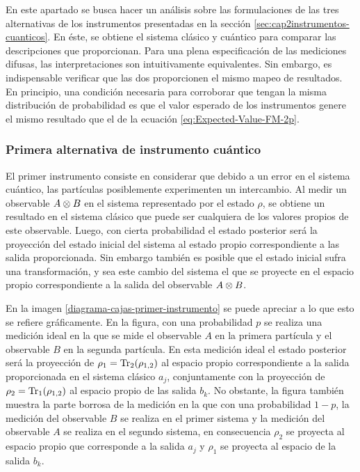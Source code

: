 En este apartado se busca hacer un análisis sobre las formulaciones de las tres alternativas de los instrumentos presentadas en la sección {\ref{sec:cap2instrumentos-cuanticos}}. En éste, se obtiene el sistema clásico y cuántico para comparar las descripciones que proporcionan. Para una plena especificación de las mediciones difusas, las interpretaciones son intuitivamente equivalentes. Sin embargo, es indispensable verificar que las dos proporcionen el mismo mapeo de resultados. En principio, una condición necesaria para corroborar que tengan la misma distribución de probabilidad es que el valor esperado de los instrumentos genere el mismo resultado que el de la ecuación {\eqref{eq:Expected-Value-FM-2p}}. 


\subsubsection{Primera alternativa de instrumento cuántico} %



El primer instrumento consiste en considerar que debido a un error en el
sistema cuántico, las partículas posiblemente experimenten un intercambio. Al
medir un observable ${A \otimes B}$ en el sistema representado por el estado $\rho$, se obtiene un resultado  en
el sistema clásico que puede ser cualquiera de los valores propios de este
observable. Luego, con cierta probabilidad el estado posterior será la
proyección del estado inicial del sistema al estado propio correspondiente a
las salida proporcionada. Sin embargo también es posible que el estado inicial
sufra una transformación, y sea este cambio del sistema el que se proyecte en
el espacio propio correspondiente a la salida del observable $A\otimes B$.


En la imagen {\ref{diagrama-cajas-primer-instrumento}} se puede apreciar a lo
que esto se refiere gráficamente.  En la figura, con una probabilidad $p$ se
realiza una medición ideal en la que se mide el observable $A$ en la primera
partícula y el observable $B$ en la segunda partícula. En esta medición ideal
el estado posterior será la proyección de $\rho_1={\rm Tr}_2(\rho_{1,2})$
al espacio propio
correspondiente a la salida proporcionada en el sistema clásico $a_j$,
conjuntamente con la proyección de $\rho_2={\rm Tr}_1(\rho_{1,2})$ al espacio propio de las
salida $b_k$. 
No obstante, la figura también muestra la parte borrosa de la medición en la que con una probabilidad $1-p$,
la medición del observable $B$ se realiza en el primer sistema y la medición
del observable $A$ se realiza en el segundo sistema, en consecuencia $\rho_2$ se proyecta al espacio propio que corresponde a la salida
$a_j$ y $\rho_1$ se proyecta al espacio de la salida $b_k$.



